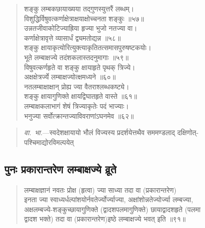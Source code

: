 \documentclass[11pt,a4paper]{article}
\newcommand{\dev}[1]{{\devanagarifont #1}}
\newenvironment{shloka}{%
  \begin{quote}
  \small
  \setlength{\leftmargin}{2em}
  \devanagarifont
}{\end{quote}}
\newenvironment{vyakhya}{%
  \begin{quote}
  \small
  \setlength{\leftmargin}{1em}
  \devanagarifont
}{\end{quote}}
\newcommand{\skt}[1]{{\devanagarifont #1}}
\begin{document}
\begin{shloka}
\skt{शङ्कु लम्बकछायाख्यया तद्‌गुणस्युत्तरैं लब्धम्।}\\
\skt{विशुद्धिर्विषुवत्कर्णाक्षेत्राक्षयाक्षोच्चनता शङ्कुः ॥५७॥}\\[0.3em]
\skt{उन्नतजीवाकोटिज्याह्रिया हृज्या भुजो नतज्या वा।}\\
\skt{कर्णाक्षेत्रावृत्ते व्यासार्धं द्व्यमतोद्यन्न ॥५८॥}\\[0.3em]
\skt{शङ्कु क्षायाकृत्योरित्युक्त्याकृतितत्समासपुरुषष्टकयोः।}\\
\skt{भूते लम्बाक्षज्ये तदंशकलास्तदनुमागाः ॥५९॥}\\[0.3em]
\skt{विषुवत्कर्णहृते वा शङ्कु क्षायाहृते पृथक् त्रिज्ये।}\\
\skt{अक्षक्षेत्रर्ज्ये लम्बाक्षज्योत्क्षमध्यने ॥६०॥}\\[0.3em]
\skt{नतलम्बाक्षाक्षान् प्रोह्य ज्या वैतराश्लब्धकष्ट्ये।}\\
\skt{शङ्कु क्षायागुणिक्ते क्षायद्विघातहृते वास्ते ॥६१॥}\\[0.3em]
\skt{लम्बाक्षकलाभागं शेषं त्रिज्याकृतेः पदं भाज्याः।}\\
\skt{भनुज्या सर्वोत्क्रान्तज्याविवराणांऽघनमेव ॥६२॥}
\end{shloka}

\begin{vyakhya}
\textit{वा.\ भा.}—\skt{स्वदेशक्षायायो भौलं विज्यस्य प्रदर्शयेत्तथैव सममण्डलाद्‌ दक्षिणोत्-}\\
\skt{पश्चिमाद्योरविमल्पयेत्}
\end{vyakhya}



\subsection{\dev{पुनः प्रकारान्तरेण लम्बाक्षज्ये व्रूते}}

\begin{shloka}
\skt{लम्बाक्षज्ञानं नवतः प्रोक्ष (हृत्वा) ज्या साध्या तदा वा (प्रकारान्तरेण)}\\
\skt{इनता ज्या स्वाध्यर्धल्पांशयोर्नवतेर्ज्योर्ज्याज्या, अक्षांशोन्नतेज्योर्ज्या लम्बज्या,}\\
\skt{अक्षलम्बज्ये-शङ्कुच्छायागुणिक्ते (द्वादशपलमागुणिक्ते) छायाद्वादशहृते (पलमा}\\
\skt{द्वादश भक्ते) तदा वा (प्रकारान्तरेण)इष्‍ठे लम्बाक्षज्ये भवत् इति ॥९१॥}
\end{shloka}
\end{document}
